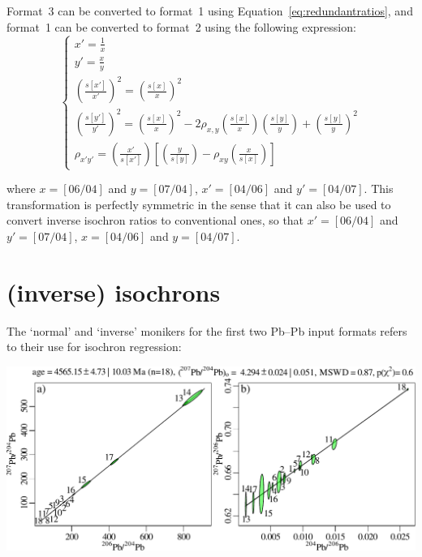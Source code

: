 \begin{refsection}
Format~3 can be converted to format~1 using
Equation~\ref{eq:redundantratios}, and format~1 can be converted to
format~2 using the following expression:
\begin{equation}
  \begin{cases}
    x' = \frac{1}{x} \\
    y' = \frac{x}{y} \\
    \left(\frac{s[x']}{x'}\right)^2 = 
    \left(\frac{s[x]}{x}\right)^2 \\
    \left(\frac{s[y']}{y'}\right)^2 =
    \left(\frac{s[x]}{x}\right)^2 -
    2 \rho_{x,y}\left(\frac{s[x]}{x}\right)\left(\frac{s[y]}{y}\right) +
    \left(\frac{s[y]}{y}\right)^2 \\
    \rho_{x'y'} =
    \left(\frac{x'}{s[x']}\right)
    \left[
    \left(\frac{y}{s[y]}\right) -
    \rho_{xy}\left(\frac{x}{s[x]}\right)
    \right]
  \end{cases}
  \label{eq:format12transformation}
\end{equation}

\noindent where $x=[06/04]$ and $y=[07/04]$, $x'=[04/06]$ and
$y'=[04/07]$. This transformation is perfectly symmetric in the sense
that it can also be used to convert inverse isochron ratios to
conventional ones, so that $x'=[06/04]$ and $y'=[07/04]$, $x=[04/06]$
and $y=[04/07]$.

\section{(inverse) isochrons}\label{sec:inverseIsochrons}

The `normal' and `inverse' monikers for the first two Pb--Pb input
formats refers to their use for isochron regression:

\begin{center}
\includegraphics[width=.9\linewidth]{../figures/PbPb.pdf}\\ 
\end{center}


\end{refsection}
